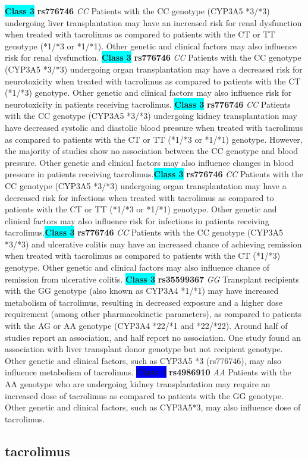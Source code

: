 \documentclass{book}
\begin{document}
\begin{center}
\textbf{\colorbox{cyan} {Class 3}} \textbf{ rs776746 } \textit{ CC }
Patients with the CC genotype (CYP3A5 *3/*3) undergoing liver transplantation may have an increased risk for renal dysfunction when treated with tacrolimus as compared to patients with the CT or TT genotype (*1/*3 or *1/*1). Other genetic and clinical factors may also influence risk for renal dysfunction. \textbf{\colorbox{cyan} {Class 3}} \textbf{ rs776746 } \textit{ CC }
Patients with the CC genotype (CYP3A5 *3/*3) undergoing organ transplantation may have a decreased risk for neurotoxicity when treated with tacrolimus as compared to patients with the CT (*1/*3) genotype. Other genetic and clinical factors may also influence risk for neurotoxicity in patients receiving tacrolimus. \textbf{\colorbox{cyan} {Class 3}} \textbf{ rs776746 } \textit{ CC }
Patients with the CC genotype (CYP3A5 *3/*3) undergoing kidney transplantation may have decreased systolic and diastolic blood pressure when treated with tacrolimus as compared to patients with the CT or TT (*1/*3 or *1/*1) genotype. However, the majority of studies show no association between the CC genotype and blood pressure. Other genetic and clinical factors may also influence changes in blood pressure in patients receiving tacrolimus.\textbf{\colorbox{cyan} {Class 3}} \textbf{ rs776746 } \textit{ CC }
Patients with the CC genotype (CYP3A5 *3/*3) undergoing organ transplantation may have a decreased risk for infections when treated with tacrolimus as compared to patients with the CT or TT (*1/*3 or *1/*1) genotype. Other genetic and clinical factors may also influence risk for infections in patients receiving tacrolimus.\textbf{\colorbox{cyan} {Class 3}} \textbf{ rs776746 } \textit{ CC }
Patients with the CC genotype (CYP3A5 *3/*3) and ulcerative colitis may have an increased chance of achieving remission when treated with tacrolimus as compared to patients with the CT (*1/*3) genotype. Other genetic and clinical factors may also influence chance of remission from ulcerative colitis. \textbf{\colorbox{cyan} {Class 3}} \textbf{ rs35599367 } \textit{ GG }
Transplant recipients with the GG genotype (also known as CYP3A4 *1/*1) may have increased metabolism of tacrolimus, resulting in decreased exposure and a higher dose requirement (among other pharmacokinetic parameters), as compared to patients with the AG or AA genotype (CYP3A4 *22/*1 and *22/*22). Around half of studies report an association, and half report no association. One study found an association with liver transplant donor genotype but not recipient genotype. Other genetic and clinical factors, such as CYP3A5 *3 (rs776746), may also influence metabolism of tacrolimus.
\textbf{\colorbox{blue} {Class 4}} \textbf{ rs4986910 } \textit{ AA }
Patients with the AA genotype who are undergoing kidney transplantation may require an increased dose of tacrolimus as compared to patients with the GG genotype. Other genetic and clinical factors, such as CYP3A5*3, may also influence dose of tacrolimus.

\end{center}\subsection{ tacrolimus }
\end{document}

